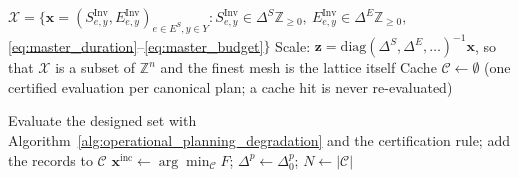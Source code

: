 
\begin{algorithm}[htbp!]
    \caption{\textcolor{blue}{Derivative-free shared-ESS planning search (mesh adaptive direct search on the
    investment lattice) with certified ADMM recourse evaluations}}
    \label{alg:shared_ess_planning_mads}
    \DontPrintSemicolon


    $\mathcal{X} = \{\boldsymbol{x} = (S^{\text{Inv}}_{e,y}, E^{\text{Inv}}_{e,y})_{e \in E^S, y \in Y}:
    S^{\text{Inv}}_{e,y} \in \Delta^S \mathbb{Z}_{\ge 0},\ E^{\text{Inv}}_{e,y} \in \Delta^E \mathbb{Z}_{\ge 0},$
    \eqref{eq:master_duration}--\eqref{eq:master_budget}$\}$\;
    Scale: $\boldsymbol{z} = \mathrm{diag}(\Delta^S, \Delta^E, \ldots)^{-1}\boldsymbol{x}$, so that $\mathcal{X}$ is a
    subset of $\mathbb{Z}^{n}$ and the finest mesh is the lattice itself\;
    Cache $\mathcal{C} \gets \emptyset$ (one certified evaluation per canonical plan; a cache hit is never
    re-evaluated)\;

    Evaluate the designed set with Algorithm~\ref{alg:operational_planning_degradation} and the certification
    rule; add the records to $\mathcal{C}$\;
    $\boldsymbol{x}^{\text{inc}} \gets \arg\min_{\mathcal{C}} F$; $\Delta^p \gets \Delta^p_0$; $N \gets |\mathcal{C}|$\;


\end{algorithm}
